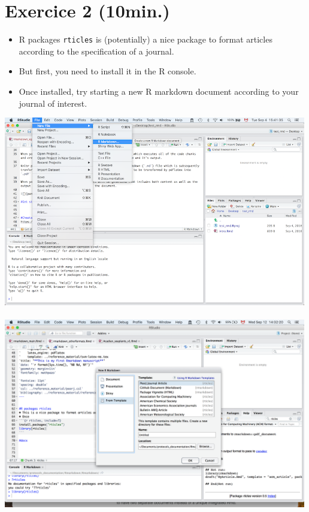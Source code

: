 \documentclass[]{article}
\begin{document}
\hypertarget{exercice-2-10min.}{%
\section{Exercice 2 (10min.)}\label{exercice-2-10min.}}

\begin{itemize}
\item
  R packages \texttt{rticles} is (potentially) a nice package to format
  articles according to the specification of a journal.
\item
  But first, you need to install it in the R console.
\item
  Once installed, try starting a new R markdown document according to
  your journal of interest.
\end{itemize}

\includegraphics[width=5.20833in,height=\textheight]{../figures/getstarted.png}\\
\hspace*{0.333em}\\
\includegraphics[width=5.20833in,height=\textheight]{../figures/from_template.png}\\
\hspace*{0.333em}
\end{document}
